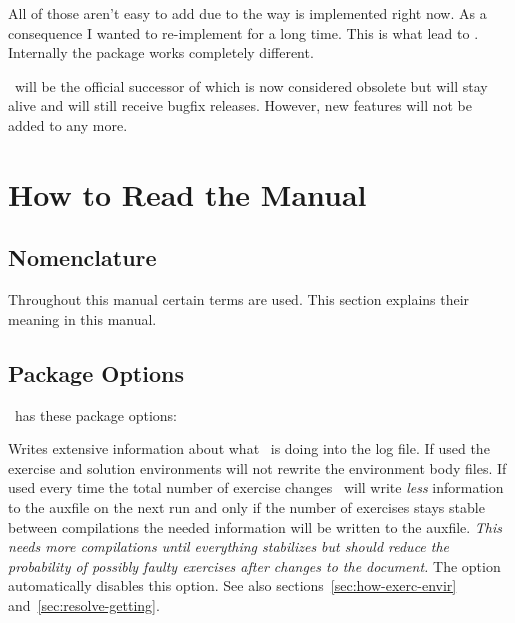 \documentclass{xsim-manual}
\begin{document}
All of those aren't easy to add due to the way  is implemented
right now. As a consequence I wanted to re-implement  for a long
time.  This is what lead to \xsim.  Internally the package works completely
different.

\begin{bewareofthedog}
  \xsim\ will be the official successor of  which is now
  considered obsolete but will stay alive and will still receive bugfix
  releases. However, new features will not be added to  any
  more.
\end{bewareofthedog}

\section{How to Read the Manual}\label{sec:how-read-manual}

\subsection{Nomenclature}

Throughout this manual certain terms are used.  This section explains their
meaning in this manual.

\acuseall
\printacronyms[heading=none]

\subsection{Package Options}\label{sec:package-options}
\xsim\ has these package options:
\begin{options}
    Writes extensive information about what \xsim\ is doing into the log
    file.
    If used the exercise and solution environments will not rewrite the
    environment body files.
    If used every time the  total number of exercise changes \xsim\ will write
    \emph{less} information to the auxfile on the next run and only if the
    number of exercises stays stable between compilations the needed
    information will be written to the auxfile. \emph{This needs more
      compilations until everything stabilizes but should reduce the
      probability of possibly faulty exercises after changes to the document.}
    The  option automatically disables this option.  See also
    sections~\vref{sec:how-exerc-envir} and~\vref{sec:resolve-getting}.
\end{options}
\end{document}

